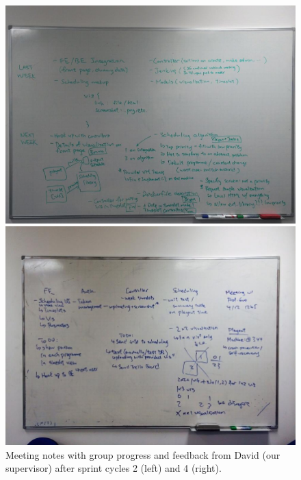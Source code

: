 \documentclass[a4paper, titlepage]{article}
\begin{document}
\begin{figure}[ht]
  \begin{minipage}{0.49\textwidth}
    \includegraphics[width = \textwidth, trim = 0 0.4cm 0 1.6cm, clip]{./eval/meeting-board2.jpg}
  \end{minipage}
  \begin{minipage}{0.49\textwidth}
    \includegraphics[width = \textwidth, trim = 1.2cm 1.5cm 1.2cm 2.5cm, clip]{./eval/meeting-board.jpg}
  \end{minipage}
  \caption{Meeting notes with group progress and feedback from David (our supervisor) after sprint cycles 2 (left) and 4 (right).}
  \label{fig:eval_meetingboard}
\end{figure}
\end{document}
